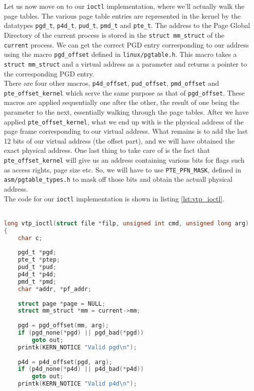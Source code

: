 \documentclass[a4paper,10pt]{article}
\begin{document}
\begin{flushleft}
Let us now move on to our \verb|ioctl| implementation, where we'll actually walk the page tables. The various page table entries are represented
in the kernel by the datatypes \verb|pgd_t|, \verb|p4d_t|, \verb|pud_t|, \verb|pmd_t| and \verb|pte_t|. The address to the Page Global Directory
of the current process is stored in the \verb|struct mm_struct| of the \verb|current| process. We can get the correct PGD entry corresponding
to our address using the macro \verb|pgd_offset| defined in \verb|linux/pgtable.h|. This macro takes a \verb|struct mm_struct| and a virtual
address as a parameter and returns a pointer to the corresponding PGD entry.\\
There are four other macros, \verb|p4d_offset|, \verb|pud_offset|, \verb|pmd_offset| and \verb|pte_offset_kernel| which serve the same purpose
as that of \verb|pgd_offset|. These macros are applied sequentially one after the other, the result of one being the parameter to the next,
essentially walking through the page tables. After we have applied \verb|pte_offset_kernel|, what we end up with is the physical address
of the page frame corresponding to our virtual address. What remains is to add the last 12 bits of our virtual address (the offset part),
and we will have obtained the exact physical address. One last thing to take care of is the fact that \verb|pte_offset_kernel| will give
us an address containing various bits for flags such as access rights, page size etc. So, we will have to use \verb|PTE_PFN_MASK|, defined
in \verb|asm/pgtable_types.h| to mask off those bits and obtain the actuall physical address.\\
The code for our \verb|ioctl| implementation is shown in listing \ref{lst:vtp_ioctl}.\\~\\

\begin{lstlisting}[caption={Our ioctl function},label={lst:vtp_ioctl},language=C, style=mystyle]
long vtp_ioctl(struct file *filp, unsigned int cmd, unsigned long arg)
{
	char c;
	
	pgd_t *pgd;
	pte_t *ptep;
	pud_t *pud;
	p4d_t *p4d;
	pmd_t *pmd;
	char *addr, *pf_addr;
	
	struct page *page = NULL;
	struct mm_struct *mm = current->mm;
	
	pgd = pgd_offset(mm, arg);
	if (pgd_none(*pgd) || pgd_bad(*pgd))
		goto out;
	printk(KERN_NOTICE "Valid pgd\n");
	
	p4d = p4d_offset(pgd, arg);
	if (p4d_none(*p4d) || p4d_bad(*p4d))
		goto out;
	printk(KERN_NOTICE "Valid p4d\n");
	

\end{lstlisting}
\end{flushleft}
\end{document}

